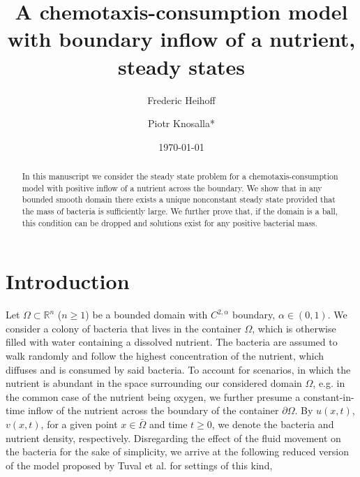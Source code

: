 \documentclass[12pt,a4paper]{amsart}
\author[F. Heihoff]{Frederic Heihoff}
\author[P. Knosalla]{Piotr Knosalla*}
\title[A chemotaxis-consumption model with boundary inflow]{A chemotaxis-consumption model with boundary inflow of a nutrient, steady states}
\theoremstyle{definition}
\theoremstyle{remark}
\numberwithin{equation}{section}
\numberwithin{theorem}{section}
\begin{document}
\begin{abstract}
In this manuscript we consider the steady state problem for a chemotaxis-consumption model with positive inflow of a nutrient across the boundary. We show that in any bounded smooth domain there exists a unique nonconstant steady state provided that the mass of bacteria is sufficiently large. We further prove that, if the domain is a ball, this condition can be dropped and solutions exist for any positive bacterial mass.
\end{abstract}



\date{\today}
\maketitle

\baselineskip=16pt

\section{Introduction}


Let $\Omega\subset\mathbb{R}^n$ ($n\geq 1$) be a bounded domain with $C^{2,\alpha}$ boundary, $\alpha\in(0,1)$. We consider a colony of bacteria that lives in the container $\Omega$, which is otherwise filled with water containing a dissolved nutrient. The bacteria are assumed to walk randomly and follow the highest concentration of the nutrient, which diffuses and is consumed by said bacteria. To account for scenarios, in which the nutrient is abundant in the space surrounding our considered domain $\Omega$, e.g. in the common case of the nutrient being oxygen, we further presume a constant-in-time inflow of the nutrient across the boundary of the container $\partial\Omega$. By $u(x,t)$, $v(x,t)$, for a given point $x\in\bar{\Omega}$ and time $t\geq 0$, we denote the bacteria and nutrient density, respectively. Disregarding the effect of the fluid movement on the bacteria for the sake of simplicity, we arrive at the following reduced version of the model proposed by Tuval et al. \cite{Tuval} for settings of this kind,  
\end{document}
